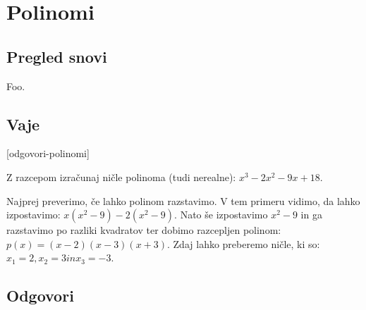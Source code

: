 \chapter{Polinomi}
\label{cha:polinomi}

\section{Pregled snovi}
\label{sec:polinomi-pregled-snovi}

Foo.

\section{Vaje}
\label{sec:polinomi-funkcije-vaje}


[odgovori-polinomi]

\begin{vaja}
Z razcepom izračunaj ničle polinoma (tudi nerealne):
$x^3-2x^2-9x+18$.

  \begin{odgovor}
 Najprej preverimo, če lahko polinom razstavimo. V tem primeru vidimo, da lahko izpostavimo: $x(x^2-9) - 2(x^2-9)$. Nato še izpostavimo $x^2-9$ in ga razstavimo po razliki kvadratov ter dobimo razcepljen polinom:
$p(x) = (x-2)(x-3)(x+3)$. Zdaj lahko preberemo ničle, ki so: $x_1=2, x_2=3 in x_3=-3$.
  \end{odgovor}
\end{vaja}



\section{Odgovori}
\label{sec:polinomi-odgovori}







